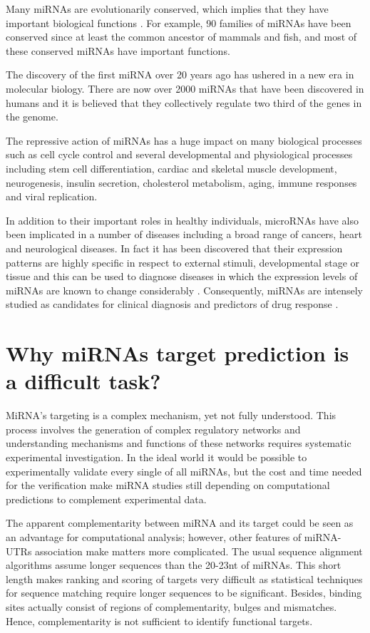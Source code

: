 Many miRNAs are evolutionarily conserved, which implies that they have important biological functions \cite{conserved_pairing}. For example, 90 families of miRNAs have been conserved since at least the common ancestor of mammals and fish, and most of these conserved miRNAs have important functions.

The discovery of the first miRNA over 20 years ago has ushered in a new era in molecular biology. There are now over 2000 miRNAs that have been discovered in humans and it is believed that they collectively regulate two third of the genes in the genome.

The repressive action of miRNAs has a huge impact on many biological processes such as cell cycle control and several developmental and physiological processes including stem cell differentiation, cardiac and skeletal muscle development, neurogenesis, insulin secretion, cholesterol metabolism, aging, immune responses and viral replication. \cite{mirna_annotation}

In addition to their important roles in healthy individuals, microRNAs have also been implicated in a number of diseases including a broad range of cancers, heart and neurological diseases.  In fact it has been discovered that their expression patterns  are highly specific in respect to external stimuli, developmental stage or tissue and this can be used to diagnose diseases in which the expression levels of miRNAs are known to change considerably \cite{computational_methods}. Consequently, miRNAs are intensely studied as candidates for clinical diagnosis and predictors of drug response \cite{mirna_diseases}.

\section{Why miRNAs target prediction is a difficult task?}
MiRNA's targeting is a complex mechanism, yet not fully understood. This process involves the generation of complex regulatory networks and understanding mechanisms and functions of these networks requires systematic experimental investigation. In the ideal world it would be possible to experimentally validate every single of all miRNAs, but the cost and time needed for the verification make miRNA studies still depending on computational predictions to complement experimental data.

The apparent complementarity between miRNA and its target could be seen as an advantage
for computational analysis; however, other features of miRNA-UTRs association make matters more complicated. The usual sequence alignment algorithms assume longer sequences than the  20-23nt of miRNAs. This short length makes ranking and scoring of targets very difficult as statistical techniques for sequence matching require longer sequences to be significant. Besides, binding sites actually consist of regions of complementarity, bulges and mismatches. Hence, complementarity is not sufficient to identify functional targets.  

